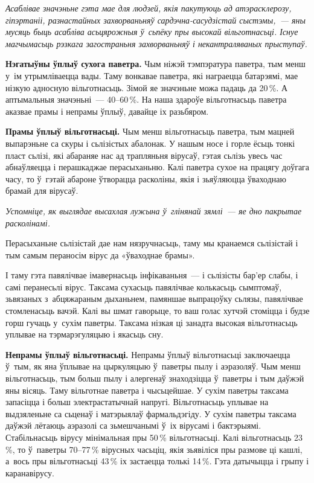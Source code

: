 \emph{Асаблівае значэньне гэта мае для людзей, якія пакутуюць ад атэрасклерозу, гіпэртаніі, разнастайных захворваньняў сардэчна-сасудзістай сыстэмы,~--- яны мусяць быць асабліва асьцярожныя ў~сьпёку пры высокай вільготнасьці. Існуе магчымасьць рэзкага загостраньня захворваньняў і некантраляваных прыступаў.}

\textbf{Нэгатыўны ўплыў сухога паветра.} Чым ніжэй тэмпэратура паветра, тым менш у~ім утрымліваецца вады. Таму вонкавае паветра, які награецца батарэямі, мае нізкую адносную вільготнасьць. Зімой яе значэньне можа падаць да 20\,\%. А аптымальныя значэньні~--- 40--60\,\%. На наша здароўе вільготнасьць паветра аказвае прамы і непрамы ўплыў, давайце іх разьбяром.

\textbf{Прамы ўплыў вільготнасьці.} Чым менш вільготнасьць паветра, тым мацней выпарэньне са скуры і сьлізістых абалонак. У нашым носе і горле ёсьць тонкі пласт сьлізі, які абараняе нас ад трапляньня вірусаў, гэтая сьлізь увесь час абнаўляецца і перашкаджае перасыханьню. Калі паветра сухое на працягу доўгага часу, то ў~гэтай абароне ўтворацца расколіны, якія і зьяўляюцца ўваходнаю брамай для вірусаў.

\emph{Успомніце, як выглядае высахлая лужына ў~глінянай зямлі~--- яе дно пакрытае расколінамі.}

Перасыханьне сьлізістай дае нам нязручнасьць, таму мы кранаемся сьлізістай і тым самым пераносім вірус да «ўваходнае брамы».

І таму гэта павялічвае імавернасьць інфікаваньня~--- і сьлізісты бар'ер слабы, і самі перанесьлі вірус. Таксама сухасьць павялічвае колькасьць сымптомаў, зьвязаных з~абцяжараным дыханьнем, памяншае выпрацоўку сьлязы, павялічвае стомленасьць вачэй. Калі вы шмат гаворыце, то ваш голас хутчэй стоміцца і будзе горш гучаць у~сухім паветры. Таксама нізкая ці занадта высокая вільготнасьць уплывае на тэрмарэгуляцыю і якасьць сну.

\textbf{Непрамы ўплыў вільготнасьці.} Непрамы ўплыў вільготнасьці заключаецца ў~тым, як яна ўплывае на цыркуляцыю ў~паветры пылу і аэразоляў. Чым менш вільготнасьць, тым больш пылу і алергенаў знаходзіцца ў~паветры і тым даўжэй яны вісяць. Таму вільготнае паветра і чысьцейшае. У сухім паветры таксама запасіцца і больш электрастатычнай напругі. Вільготнасьць уплывае на выдзяленьне са сьценаў і матэрыялаў фармальдэгіду. У сухім паветры таксама даўжэй лётаюць аэразолі са зьмешчанымі ў~іх вірусамі і бактэрыямі. Стабільнасьць вірусу мінімальная пры 50\,\% вільготнасьці. Калі вільготнасьць 23\,\%, то ў~паветры 70--77\,\% вірусных часьціц, якія зьявіліся пры размове ці кашлі, а~вось пры вільготнасьці 43\,\% іх застаецца толькі 14\,\%. Гэта датычыцца і грыпу і каранавірусу.

